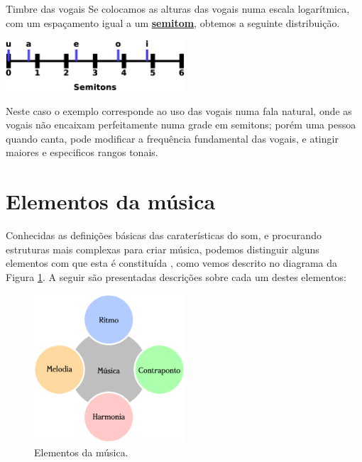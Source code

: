 \begin{elaboracion}{Timbre das vogais}
Se colocamos as alturas das vogais numa escala logarítmica, com um espaçamento igual a um
\hyperref[sec:pos:Semitom]{\textbf{semitom}},
obtemos a seguinte distribuição.
\begin{center}
\includegraphics[width=0.5\textwidth]{chapters/cap-musica-basica/vocales-semitons2a.eps}
\end{center}
Neste caso o exemplo corresponde ao uso das vogais numa fala natural, 
onde as vogais não encaixam perfeitamente numa grade em semitons;
porém uma pessoa quando canta, pode modificar a frequência fundamental das vogais,
e atingir maiores e especificos rangos tonais. 
\label{fig:timbresvocais}
\end{elaboracion}


\section{Elementos da música}
\label{sec:elementosmusica}
Conhecidas as definições básicas das caraterísticas do som, 
e procurando estruturas mais complexas para criar música,
podemos distinguir alguns elementos com que esta é constituída \cite[pp. 11]{alves2004teoria},
como vemos descrito no diagrama da Figura  \ref{fig:elementos:musica}.
A seguir são presentadas descrições sobre cada um destes elementos:

\begin{figure}[!ht]
\centering

\includegraphics[width=0.5\textwidth]{chapters/cap-musica-basica/elementos-musica-1.eps}
\caption{Elementos da música.}
\label{fig:elementos:musica}
\end{figure}

